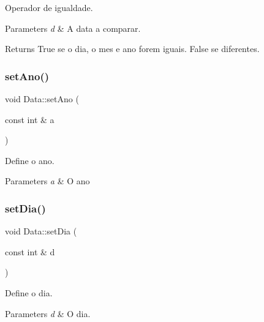 Operador de igualdade. 


\begin{DoxyParams}{Parameters}
{\em d} & A data a comparar.\\
\hline
\end{DoxyParams}
\begin{DoxyReturn}{Returns}
True se o dia, o mes e ano forem iguais. False se diferentes. 
\end{DoxyReturn}
\hypertarget{class_data_a84dbaee286db7c5c6039ea97d6293d53}{}\label{class_data_a84dbaee286db7c5c6039ea97d6293d53} 
\subsubsection{\texorpdfstring{set\+Ano()}{setAno()}}
{\footnotesize\ttfamily void Data\+::set\+Ano (\begin{DoxyParamCaption}\item[{const int \&}]{a }\end{DoxyParamCaption})}



Define o ano. 


\begin{DoxyParams}{Parameters}
{\em a} & O ano \\
\hline
\end{DoxyParams}
\hypertarget{class_data_ae417bf0daa0cd736be446ebac4a18589}{}\label{class_data_ae417bf0daa0cd736be446ebac4a18589} 
\subsubsection{\texorpdfstring{set\+Dia()}{setDia()}}
{\footnotesize\ttfamily void Data\+::set\+Dia (\begin{DoxyParamCaption}\item[{const int \&}]{d }\end{DoxyParamCaption})}



Define o dia. 


\begin{DoxyParams}{Parameters}
{\em d} & O dia. \\
\hline
\end{DoxyParams}
\hypertarget{class_data_a296b98388435fff3677ab220c7e070da}{}\label{class_data_a296b98388435fff3677ab220c7e070da} 

